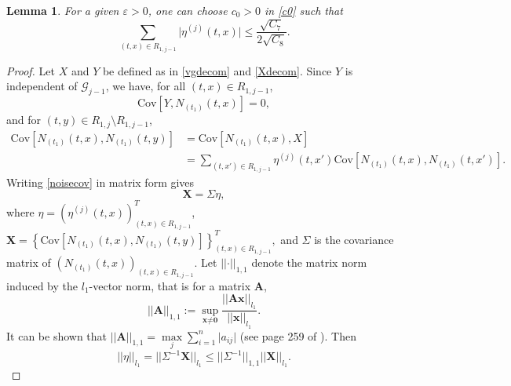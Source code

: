 \documentclass[12pt]{amsart}
\newtheorem{lemma}{Lemma}[section]
\numberwithin{equation}{section}
\newcommand{\1}{\mathbf{1}}
\begin{document}
\begin{lemma}\label{coeffbound}
For a given $\varepsilon>0$, one can choose $c_0>0$ in \eqref{c0} such that
\begin{equation*}
\sum_{(t,x)\in R_{1,j-1}}\vert\eta^{(j)}(t,x)\vert\leq \frac{\sqrt{C_7}}{2\sqrt{C_8}}.
\end{equation*}
\end{lemma}
\begin{proof}
Let $X$ and $Y$ be defined as in \eqref{vgdecom} and \eqref{Xdecom}. Since $Y$ is independent of $\mathcal{G}_{j-1}$, we have, for all $(t,x)\in R_{1,j-1}$,
\[\textrm{Cov}[Y,N_{(t_1)}(t,x)]=0,\]
and for $(t,y)\in R_{1,j}\setminus R_{1,j-1}$,
\begin{equation}
\label{noisecov}
\begin{split}
\textrm{Cov}[N_{(t_1)}(t,x),N_{(t_1)}(t,y)]&=\textrm{Cov}[N_{(t_1)}(t,x),X]\\
&=\sum_{(t,x')\in R_{1,j-1}}\eta^{(j)}(t,x') \textrm{Cov}[N_{(t_1)}(t,x),N_{(t_1)}(t,x')].
\end{split}
\end{equation}
Writing \eqref{noisecov} in matrix form gives
\begin{equation*}
\textbf{X} =\Sigma\eta,
\end{equation*}
where $\eta=\left(\eta^{(j)}(t,x)\right)_{(t,x)\in R_{1,j-1}}^T$, $\textbf{X}=\left\lbrace\textrm{Cov}[N_{(t_1)}(t,x),N_{(t_1)}(t,y)]\right\rbrace_{(t,x)\in R_{1,j-1}}^T,$
and $\Sigma$ is the covariance matrix of $\left(N_{(t_1)}(t,x)\right)_{(t,x)\in R_{1,j-1}}$. Let $\vert\vert\cdot\vert\vert_{1,1}$ denote the matrix norm induced by the $l_1$-vector norm, that is for a matrix $\textbf{A}$,
\[\vert\vert\textbf{A}\vert\vert_{1,1}:=\sup_{\textbf{x}\neq \textbf{0}}\frac{\vert\vert \textbf{Ax}\vert\vert_{l_1}}{\vert\vert\textbf{x}\vert\vert_{l_1}}.\]
It can be shown that $\vert\vert \textbf{A}\vert\vert_{1,1}=\max\limits_j\sum\limits_{i=1}^n\vert a_{ij}\vert$ (see page 259 of \cite{rao2000linear}). Then
\begin{equation*}
\vert\vert \eta\vert\vert_{l_1}=\vert\vert\Sigma^{-1}\textbf{X}\vert\vert_{l_1}\leq\vert\vert\Sigma^{-1}\vert\vert_{1,1}\vert\vert\textbf{X}\vert\vert_{l_1}.
\end{equation*}


\end{proof}
\end{document}
